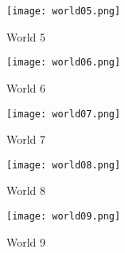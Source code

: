 \begin{figure}[H]
	\centering
	\texttt{[image: world05.png]}
	\caption{World 5}
	\label{fig:world5}
\end{figure}

\begin{figure}[H]
	\centering
	\texttt{[image: world06.png]}
	\caption{World 6}
	\label{fig:world6}
\end{figure}

\begin{figure}[H]
	\centering
	\texttt{[image: world07.png]}
	\caption{World 7}
	\label{fig:world7}
\end{figure}

\begin{figure}[H]
	\centering
	\texttt{[image: world08.png]}
	\caption{World 8}
	\label{fig:world8}
\end{figure}

\begin{figure}[H]
	\centering
	\texttt{[image: world09.png]}
	\caption{World 9}
	\label{fig:world9}
\end{figure}
